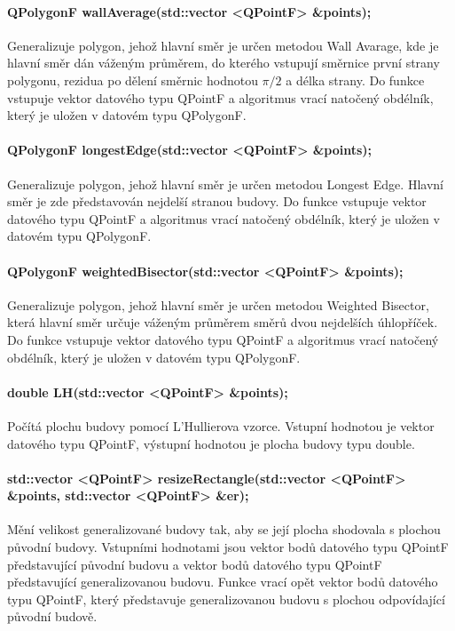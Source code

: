 \documentclass[11pt]{article}
\begin{document}
 	\paragraph{QPolygonF wallAverage(std::vector <QPointF> \&points);}
 	Generalizuje polygon, jehož hlavní směr je určen metodou Wall Avarage, kde je hlavní směr dán váženým průměrem, do kterého vstupují směrnice první strany polygonu, rezidua po dělení směrnic hodnotou $\pi/2$ a délka strany. Do funkce vstupuje vektor datového typu QPointF a algoritmus vrací natočený obdélník, který je uložen v datovém typu QPolygonF.
 	
 	\paragraph{QPolygonF longestEdge(std::vector <QPointF> \&points);}
 	Generalizuje polygon, jehož hlavní směr je určen metodou Longest Edge. Hlavní směr je zde představován nejdelší stranou budovy. Do funkce vstupuje vektor datového typu QPointF a algoritmus vrací natočený obdélník, který je uložen v datovém typu QPolygonF.
 	
 	\paragraph{QPolygonF weightedBisector(std::vector <QPointF> \&points);}
 	Generalizuje polygon, jehož hlavní směr je určen metodou Weighted Bisector, která hlavní směr určuje váženým průměrem směrů dvou nejdelších úhlopříček. Do funkce vstupuje vektor datového typu QPointF a algoritmus vrací natočený obdélník, který je uložen v datovém typu QPolygonF.
 	
 	\paragraph{double LH(std::vector <QPointF> \&points);}
 	Počítá plochu budovy pomocí L'Hullierova vzorce. Vstupní hodnotou je vektor datového typu QPointF, výstupní hodnotou je plocha budovy typu double.
 	
 	\paragraph{std::vector <QPointF> resizeRectangle(std::vector <QPointF> \&points, std::vector <QPointF> \&er);}
 	Mění velikost generalizované budovy tak, aby se její plocha shodovala s plochou původní budovy. Vstupními hodnotami jsou vektor bodů datového typu QPointF představující původní budovu a vektor bodů datového typu QPointF představující generalizovanou budovu. Funkce vrací opět vektor bodů datového typu QPointF, který představuje generalizovanou budovu s plochou odpovídající původní budově.
	 	
\end{document}
